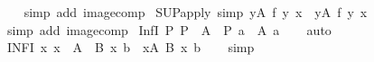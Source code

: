 \begin{isabellebody}
%
\isadelimproof
\ \ %
\endisadelimproof
%
\isatagproof
{}\isamarkupfalse%
\ {\isacharparenleft}{\kern0pt}simp\ add{\isacharcolon}{\kern0pt}\ image{\isacharunderscore}{\kern0pt}comp{\isacharparenright}{\kern0pt}%
\endisatagproof
{\isafoldproof}%
%
\isadelimproof
\isanewline
%
\endisadelimproof
\isanewline
{}\isamarkupfalse%
\ SUP{\isacharunderscore}{\kern0pt}apply\ {\isacharbrackleft}{\kern0pt}simp{\isacharbrackright}{\kern0pt}{\isacharcolon}{\kern0pt}\ {\isachardoublequoteopen}{\isacharparenleft}{\kern0pt}{\isasymSqunion}y{\isasymin}A{\isachardot}{\kern0pt}\ f\ y{\isacharparenright}{\kern0pt}\ x\ {\isacharequal}{\kern0pt}\ {\isacharparenleft}{\kern0pt}{\isasymSqunion}y{\isasymin}A{\isachardot}{\kern0pt}\ f\ y\ x{\isacharparenright}{\kern0pt}{\isachardoublequoteclose}\isanewline
%
\isadelimproof
\ \ %
\endisadelimproof
%
\isatagproof
{}\isamarkupfalse%
\ {\isacharparenleft}{\kern0pt}simp\ add{\isacharcolon}{\kern0pt}\ image{\isacharunderscore}{\kern0pt}comp{\isacharparenright}{\kern0pt}%
\endisatagproof
{\isafoldproof}%
%
\isadelimproof
%
\endisadelimproof
%
\isadelimdocument
%
\endisadelimdocument
%
\isatagdocument
%
\isamarkuptrue%
%
\endisatagdocument
{\isafolddocument}%
%
\isadelimdocument
%
\endisadelimdocument
{}\isamarkupfalse%
\ Inf{}{\isacharunderscore}{\kern0pt}I{\isacharcolon}{\kern0pt}\ {\isachardoublequoteopen}{\isacharparenleft}{\kern0pt}{\isasymAnd}P{\isachardot}{\kern0pt}\ P\ {\isasymin}\ A\ {\isasymLongrightarrow}\ P\ a{\isacharparenright}{\kern0pt}\ {\isasymLongrightarrow}\ {\isacharparenleft}{\kern0pt}{\isasymSqinter}A{\isacharparenright}{\kern0pt}\ a{\isachardoublequoteclose}\isanewline
%
\isadelimproof
\ \ %
\endisadelimproof
%
\isatagproof
{}\isamarkupfalse%
\ auto%
\endisatagproof
{\isafoldproof}%
%
\isadelimproof
\isanewline
%
\endisadelimproof
\isanewline
{}\isamarkupfalse%
\ INF{}{\isacharunderscore}{\kern0pt}I{\isacharcolon}{\kern0pt}\ {\isachardoublequoteopen}{\isacharparenleft}{\kern0pt}{\isasymAnd}x{\isachardot}{\kern0pt}\ x\ {\isasymin}\ A\ {\isasymLongrightarrow}\ B\ x\ b{\isacharparenright}{\kern0pt}\ {\isasymLongrightarrow}\ {\isacharparenleft}{\kern0pt}{\isasymSqinter}x{\isasymin}A{\isachardot}{\kern0pt}\ B\ x{\isacharparenright}{\kern0pt}\ b{\isachardoublequoteclose}\isanewline
%
\isadelimproof
\ \ %
\endisadelimproof
%
\isatagproof
{}\isamarkupfalse%
\ simp%
\endisatagproof
{\isafoldproof}%
%
\isadelimproof
\isanewline
%
\endisadelimproof

\end{isabellebody}
